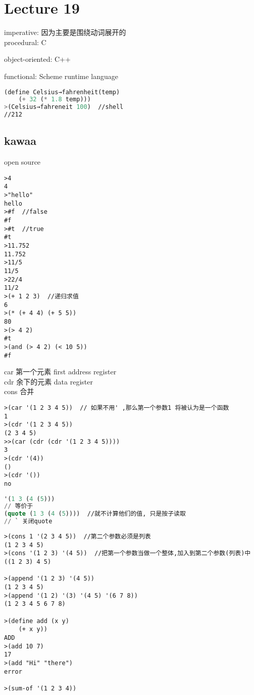 \documentclass{article}
\begin{document}
\section{Lecture 19}
imperative: 因为主要是围绕动词展开的\\
procedural:
C

object-oriented:
C++

functional:
Scheme	runtime language

\begin{lstlisting}[language = Lisp]
(define Celsius→fahrenheit(temp)
	(+ 32 (* 1.8 temp)))
>(Celsius→fahreneit 100)  //shell
//212
\end{lstlisting}

\subsection{kawaa}
open source
\begin{verbatim}
>4
4
>"hello"
hello
>#f  //false
#f
>#t  //true
#t
>11.752
11.752
>11/5
11/5
>22/4
11/2
>(+ 1 2 3)  //递归求值
6
>(* (+ 4 4) (+ 5 5))
80
>(> 4 2)
#t
>(and (> 4 2) (< 10 5))
#f
\end{verbatim}

\bigskip\noindent
car 第一个元素 first  address register\\
cdr 余下的元素  data register\\
cons 合并\\
\begin{verbatim}
>(car '(1 2 3 4 5))  // 如果不用' ,那么第一个参数1 将被认为是一个函数
1
>(cdr '(1 2 3 4 5))
(2 3 4 5)
>>(car (cdr (cdr '(1 2 3 4 5))))
3
>(cdr '(4))
()
>(cdr '())
no
\end{verbatim}

\begin{lstlisting}[language = Lisp]
'(1 3 (4 (5)))
// 等价于
(quote (1 3 (4 (5))))  //就不计算他们的值, 只是按子读取
// ` 关闭quote
\end{lstlisting}

\begin{verbatim}
>(cons 1 '(2 3 4 5))  //第二个参数必须是列表
(1 2 3 4 5)
>(cons '(1 2 3) '(4 5))  //把第一个参数当做一个整体,加入到第二个参数(列表)中
((1 2 3) 4 5)

>(append '(1 2 3) '(4 5))
(1 2 3 4 5)
>(append '(1 2) '(3) '(4 5) '(6 7 8))
(1 2 3 4 5 6 7 8)

>(define add (x y)
	(+ x y))
ADD
>(add 10 7)
17
>(add "Hi" "there")
error

>(sum-of '(1 2 3 4))
\end{verbatim}
\end{document}
